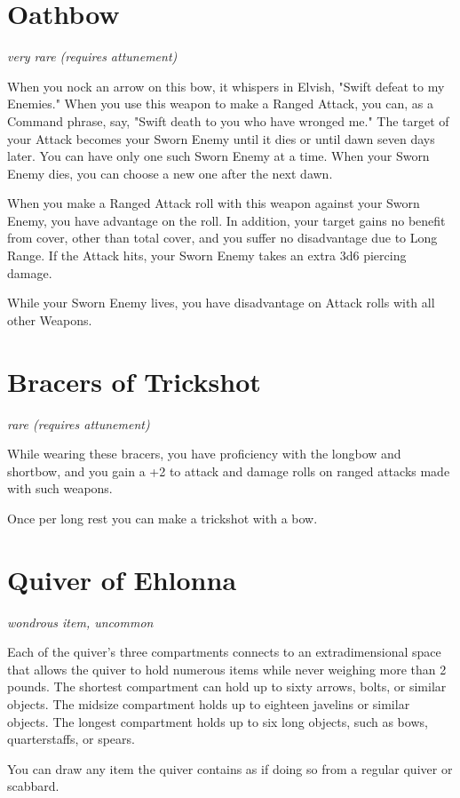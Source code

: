 \documentclass[letterpaper,openany,oneside,twocolumn]{book}
\begin{document}
\section*{Oathbow}
\textit{very rare (requires attunement)}

When you nock an arrow on this bow, it whispers in Elvish, "Swift defeat to my Enemies." When you use this weapon to make a Ranged Attack, you can, as a Command phrase, say, "Swift death to you who have wronged me." The target of your Attack becomes your Sworn Enemy until it dies or until dawn seven days later. You can have only one such Sworn Enemy at a time. When your Sworn Enemy dies, you can choose a new one after the next dawn.

When you make a Ranged Attack roll with this weapon against your Sworn Enemy, you have advantage on the roll. In addition, your target gains no benefit from cover, other than total cover, and you suffer no disadvantage due to Long Range. If the Attack hits, your Sworn Enemy takes an extra 3d6 piercing damage.

While your Sworn Enemy lives, you have disadvantage on Attack rolls with all other Weapons.

\section*{Bracers of Trickshot}
\textit{rare (requires attunement)}

While wearing these bracers, you have proficiency with the longbow and shortbow, and you gain a +2 to attack and damage rolls on ranged attacks made with such weapons.

Once per long rest you can make a trickshot with a bow.

\section*{Quiver of Ehlonna}
\textit{wondrous item, uncommon}

Each of the quiver's three compartments connects to an extradimensional space that allows the quiver to hold numerous items while never weighing more than 2 pounds. The shortest compartment can hold up to sixty arrows, bolts, or similar objects. The midsize compartment holds up to eighteen javelins or similar objects. The longest compartment holds up to six long objects, such as bows, quarterstaffs, or spears.

You can draw any item the quiver contains as if doing so from a regular quiver or scabbard.
\end{document}
